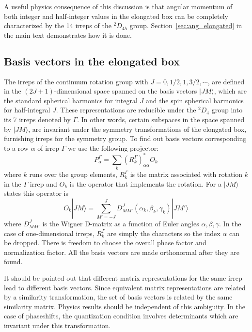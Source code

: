 \documentclass[aps,prd,reprint,showpacs,floatfix,longbibliography,,superscriptaddress]{revtex4-1}
\def\beq{\begin{equation}}
\def\eeq{\end{equation}}
\begin{document}
\begin{widetext}
A useful physics consequence of this discussion is that angular momentum of both integer and half-integer values 
in the elongated box can be completely characterized by the 14 irreps of the $^2D_{4h}$ group. 
Section~\ref{sec:ang_elongated} in the main text demonstrates how it is done.
 

\subsection{Basis vectors in the elongated box}

The irreps of the continuum rotation group with $J = 0, 1/2, 1,3/2, \cdots$,   are defined in the
$(2J+1)$-dimensional space spanned on the basis vectors $|JM\rangle$, which are the standard spherical harmonics for integral $J$ and 
the spin spherical harmonics for half-integral $J$. These representations are reducible
under the $^2D_{4}$ group into its 7  irreps denoted by $\Gamma$.  
In other words, certain subspaces in the space spanned by $|JM\rangle$, 
are invariant under the symmetry transformations of the elongated box, furnishing irreps for
the symmetry group. To find out basis vectors corresponding to a row $\alpha$ of 
irrep $\Gamma$ we use the following projector:
\beq
P^\Gamma_\alpha = \sum_k (R^\Gamma_k)^*_{\alpha\alpha} O_k
\eeq
where $k$ runs over the group elements, $R^\Gamma_k$ is the matrix associated with rotation
$k$ in the $\Gamma$ irrep and $O_k$ is the operator that implements the rotation. For
a $|JM\rangle$ states this operator is
\beq
O_k |JM\rangle = \sum_{M'=-J}^J D^J_{MM'}(\alpha_k, \beta_k, \gamma_k) |JM'\rangle
\eeq
where $D^J_{MM'}$ is the Wigner D-matrix as a function of Euler angles $\alpha, \beta,\gamma$. 
In the case of one-dimensional irreps, $R^\Gamma_k$ are simply the characters so the 
index $\alpha$ can be dropped. 
There is freedom to choose the overall phase factor and normalization factor.
All the basis vectors are made orthonormal after they are found.

It should be pointed out that different matrix representations for the same irrep 
lead to different basis vectors.
Since equivalent matrix representations are related by a similarity transformation,
the set of basis vectors is related by the same similarity matrix.
Physics results should be independent of this ambiguity.
In the case of phaseshifts, the quantization condition involves determinants 
which are invariant under this transformation.


\end{widetext}
\end{document}
